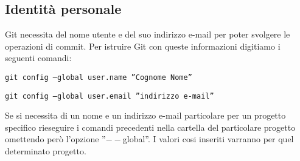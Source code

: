 \subsection{Identità personale}
Git necessita del nome utente e del suo indirizzo e-mail per poter svolgere le operazioni di commit. Per istruire Git con queste informazioni digitiamo i seguenti comandi:

\begin{center}
\texttt{git config --global user.name ''Cognome Nome''}

\texttt{git config --global user.email ''indirizzo e-mail''}
\end{center}

Se si necessita di un nome e un indirizzo e-mail particolare per un progetto specifico rieseguire i comandi precedenti nella cartella del particolare progetto omettendo però l'opzione ''$--$global''. I valori cosi inseriti varranno per quel determinato progetto.